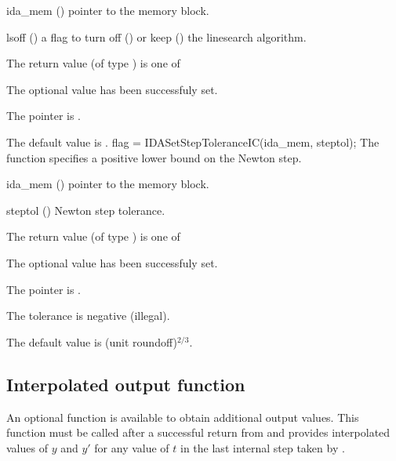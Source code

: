 {
  \begin{args}
  \item[ida\_mem] ()
    pointer to the {\ida} memory block.
  \item[lsoff] ()
    a flag to turn off () or keep () the linesearch
    algorithm.
  \end{args}
}
{
  The return value  (of type ) is one of
  \begin{args}
  \item[\Id{IDA\_SUCCESS}] 
    The optional value has been successfuly set.
  \item[\Id{IDA\_MEM\_NULL}]
    The  pointer is .
  \end{args}
}
{
  The default value is .
}
{
flag = IDASetStepToleranceIC(ida\_mem, steptol);
}
{
  The function  specifies a positive lower bound
  on the Newton step.
}
{
  \begin{args}
  \item[ida\_mem] ()
    pointer to the {\ida} memory block.
  \item[steptol] ()
    Newton step tolerance.
  \end{args}
}
{
  The return value  (of type ) is one of
  \begin{args}
  \item[\Id{IDA\_SUCCESS}] 
    The optional value has been successfuly set.
  \item[\Id{IDA\_MEM\_NULL}]
    The  pointer is .
  \item[\Id{IDA\_ILL\_INPUT}]
    The  tolerance is negative (illegal).
  \end{args}
}
{
  The default value is (unit roundoff)$^{2/3}$.
}


\subsection{Interpolated output function}\label{ss:optional_dky}

An optional function  is available to obtain additional output
values.  This function must be called after a successful return from 
and provides interpolated values of $y$ and $y'$ for any value of $t$ in the last
internal step taken by {\ida}.

